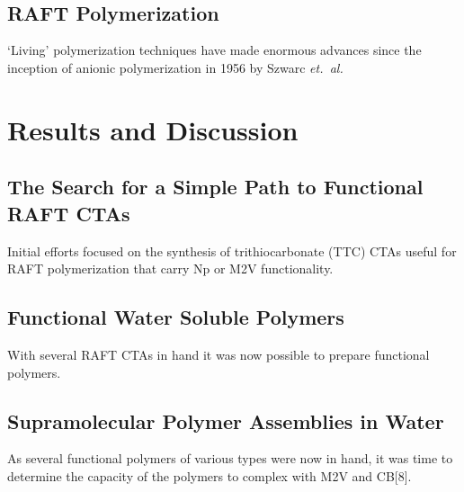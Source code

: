 \documentclass[a4wide,12pt]{report} %
\begin{document}


\\
\\
\section{RAFT Polymerization}

\noindent
`Living' polymerization techniques have made enormous advances since the inception of anionic polymerization in 1956 by Szwarc {\it et.~al.}~\cite{Szwarc:1956p46, Szwarc:1956p55} 




\chapter{Results and Discussion}




\section{The Search for a Simple Path to Functional RAFT CTAs}

\noindent
Initial efforts focused on the synthesis of trithiocarbonate (TTC) CTAs useful for RAFT polymerization that carry Np or M2V functionality.  



\section{Functional Water Soluble Polymers}

With several RAFT CTAs in hand it was now possible to prepare functional polymers.



\section{Supramolecular Polymer Assemblies in Water}


As several functional polymers of various types were now in hand, it was time to determine the capacity of the polymers to complex with M2V and CB[8].
\end{document}
